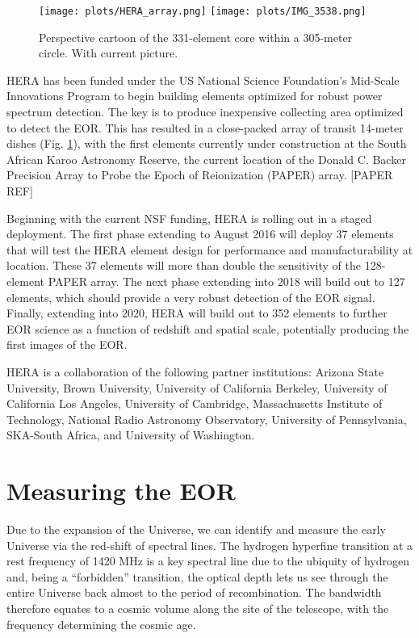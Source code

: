 \documentclass{article}
\begin{document}
\begin{figure}[t]
\texttt{[image: plots/HERA\_array.png]}
\texttt{[image: plots/IMG\_3538.png]}
\caption{Perspective cartoon of the 331-element core within a 305-meter circle.  With current picture.
\label{fig:array}}
\end{figure}

HERA has been funded under the US National Science Foundation's Mid-Scale Innovations Program to begin building elements optimized for robust power spectrum detection.  The key is to produce inexpensive collecting area optimized to detect the EOR.  This has resulted in a close-packed array of transit 14-meter dishes (Fig. \ref{fig:array}), with the first elements currently under construction at the South African Karoo Astronomy Reserve, the current location of the Donald C. Backer Precision Array to Probe the Epoch of Reionization (PAPER) array.  [PAPER REF]

Beginning with the current NSF funding, HERA is rolling out in a staged deployment.  The first phase extending to August 2016 will deploy 37 elements that will test the HERA element design for performance and manufacturability at location.  These 37 elements will more than double the sensitivity of the 128-element PAPER array.  The next phase extending into 2018 will build out to 127 elements, which should provide a very robust detection of the EOR signal.  Finally, extending into 2020, HERA will build out to 352 elements to further EOR science as a function of redshift and spatial scale, potentially producing the first images of the EOR.

HERA is a collaboration of the following partner institutions:  Arizona State University, Brown University, University of California Berkeley, University of California Los Angeles, University of Cambridge, Massachusetts Institute of Technology, National Radio Astronomy Observatory, University of Pennsylvania, SKA-South Africa, and
University of Washington.

\section{Measuring the EOR}
\label{sec:eormeas}
Due to the expansion of the Universe, we can identify and measure the early Universe via the red-shift of spectral lines.  The hydrogen hyperfine transition at a rest frequency of 1420 MHz is a key spectral line due to the ubiquity of hydrogen and, being a ``forbidden'' transition, the optical depth lets us see through the entire Universe back almost to the period of recombination.  The bandwidth
therefore equates to a cosmic volume along the site of the telescope, with the frequency determining the cosmic age.
\end{document}
